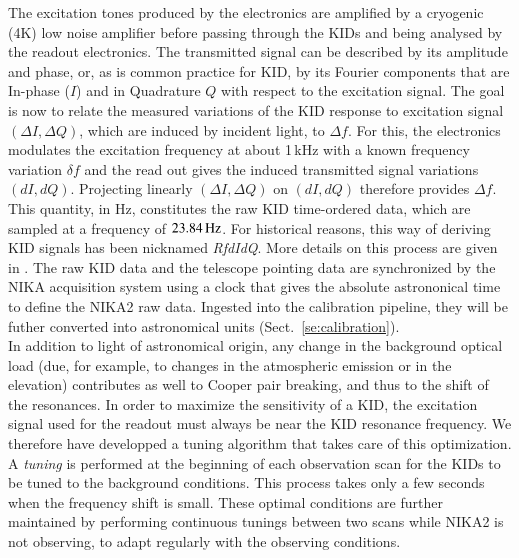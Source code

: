 The excitation tones produced by the
electronics are amplified by a cryogenic (4K) low noise amplifier
before passing through the KIDs and being analysed by the readout
electronics. The transmitted signal can be described by its
amplitude and phase, or, as is common practice for KID, by its Fourier
components that are In-phase ($I$) and in Quadrature $Q$ with respect to the excitation
signal.
The goal is now to relate the measured variations of the KID response
to excitation signal $(\Delta I, \Delta Q)$, which are induced by incident light, to
$\Delta f$. For this, the electronics modulates the excitation
frequency at about 1\,kHz with a known frequency variation $\delta f$
and the read out gives the induced transmitted signal variations
$(dI, dQ)$. Projecting linearly $(\Delta I, \Delta Q)$ on $(dI, dQ)$ therefore
provides $\Delta f$. This quantity, in Hz, constitutes the raw KID
time-ordered data, which are sampled at a frequency of
$23.84\,\rm{Hz}$. For historical reasons, this way of deriving KID
signals has been nicknamed \emph{RfdIdQ}. More details on this process
are given in \citet{Calvo2013}. The raw KID data and the telescope pointing data
are synchronized by the NIKA acquisition system using a clock that
gives the absolute astrononical time to define the NIKA2 raw data.
Ingested into the calibration pipeline, they will be futher converted
into astronomical units (Sect.~\ref{se:calibration}).\\

In addition to light of astronomical origin, any change in the
background optical load (due, for example, to changes in
the atmospheric emission or in the elevation) contributes as well to
Cooper pair breaking, and thus to the shift of the resonances. In
order to maximize the sensitivity of a KID, the
excitation signal used for the readout must always be near the KID resonance
frequency. We therefore have developped a tuning algorithm that takes care of
this optimization. A \emph{tuning} is performed at the beginning
of each observation scan for the KIDs to be tuned to the background
conditions.
This process takes only a few seconds
when the frequency shift is small.
These optimal conditions are further maintained by performing
continuous tunings between two scans while NIKA2 is not observing, to
adapt regularly with the observing conditions.


